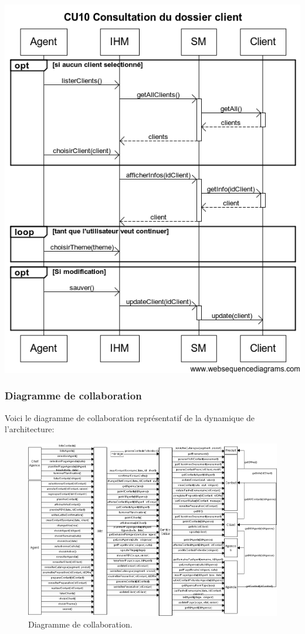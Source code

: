 \begin {center}
\includegraphics[width=\textwidth]{../../webSequenceDiagrameSources/cu10.png}
\end {center}

\subsubsection{Diagramme de collaboration}

Voici le diagramme de collaboration représentatif de la dynamique de
l'architecture:

\begin{figure}[H]
\centering
\includegraphics[scale=0.7,angle=90]{diagramme-collaboration.png}
\caption*{Diagramme de collaboration.}
\end{figure}

